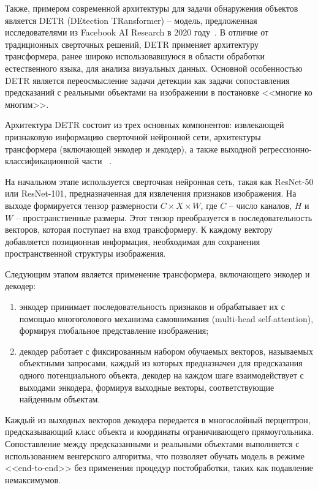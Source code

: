 Также, примером современной архитектуры для задачи обнаружения объектов является 
DETR (DEtection TRansformer) -- модель, предложенная исследователями из Facebook 
AI Research в 2020 году~\cite{detr}. В отличие от традиционных сверточных решений, 
DETR применяет архитектуру трансформера, ранее широко использовавшуюся в области 
обработки естественного языка, для анализа визуальных данных. Основной 
особенностью DETR является переосмысление задачи детекции как задачи 
сопоставления предсказаний с реальными объектами на изображении в постановке 
<<многие ко многим>>.

Архитектура DETR состоит из трех основных компонентов: извлекающей признаковую 
информацию сверточной нейронной сети, архитектуры трансформера (включающей 
энкодер и декодер), а также выходной регрессионно-классификационной части
~\cite{detr}.

На начальном этапе используется сверточная нейронная сеть, такая как ResNet-50 
или ResNet-101, предназначенная для извлечения признаков изображения. На выходе 
формируется тензор размерности $C \times X \times W$, где $C$ -- число каналов, 
$H$ и $W$ -- пространственные размеры. Этот тензор преобразуется в 
последовательность векторов, которая поступает на вход трансформеру. К каждому 
вектору добавляется позиционная информация, необходимая для сохранения 
пространственной структуры изображения.

Следующим этапом является применение трансформера, включающего энкодер и декодер:

\begin{enumerate}
    \item энкодер принимает последовательность признаков и обрабатывает их с 
    помощью многоголового механизма самовнимания (multi-head self-attention), 
    формируя глобальное представление изображения;
    \item декодер работает с фиксированным набором обучаемых векторов, называемых 
    объектными запросами, каждый из которых предназначен для предсказания одного 
    потенциального объекта, декодер на каждом шаге взаимодействует с выходами 
    энкодера, формируя выходные векторы, соответствующие найденным объектам.
\end{enumerate}

Каждый из выходных векторов декодера передается в многослойный перцептрон, 
предсказывающий класс объекта и координаты ограничивающего прямоугольника. 
Сопоставление между предсказанными и реальными объектами выполняется с 
использованием венгерского алгоритма, что позволяет обучать модель в режиме 
<<end-to-end>> без применения процедур постобработки, таких как подавление 
немаксимумов.

